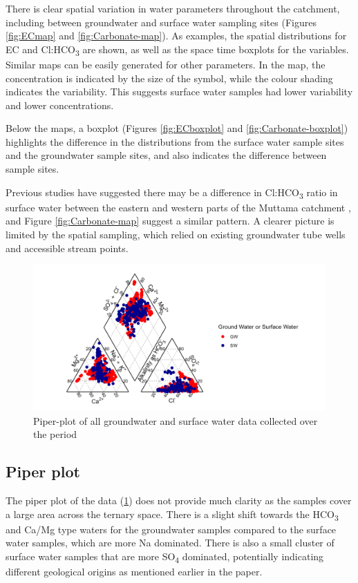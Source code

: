 \documentclass[, manuscript]{copernicus}
\begin{document}
There is clear spatial variation in water parameters throughout the
catchment, including between groundwater and surface water sampling
sites (Figures \ref{fig:ECmap} and \ref{fig:Carbonate-map}). As
examples, the spatial distributions for EC and Cl:HCO\textsubscript{3}
are shown, as well as the space time boxplots for the variables. Similar
maps can be easily generated for other parameters. In the map, the
concentration is indicated by the size of the symbol, while the colour
shading indicates the variability. This suggests surface water samples
had lower variability and lower concentrations.

Below the maps, a boxplot (Figures \ref{fig:ECboxplot} and
\ref{fig:Carbonate-boxplot}) highlights the difference in the
distributions from the surface water sample sites and the groundwater
sample sites, and also indicates the difference between sample sites.

Previous studies have suggested there may be a difference in
Cl:HCO\textsubscript{3} ratio in surface water between the eastern and
western parts of the Muttama catchment \citep{Conyers2008}, and Figure
\ref{fig:Carbonate-map} suggest a similar pattern. A clearer picture is
limited by the spatial sampling, which relied on existing groundwater
tube wells and accessible stream points.

\begin{figure}
\includegraphics[width=0.8\linewidth]{Figures/piper_plot} \caption{Piper-plot of all groundwater and surface water data collected over the period}\label{fig:piperplot}
\end{figure}

\subsection{Piper plot}

The piper plot of the data (\ref{fig:piperplot}) does not provide much
clarity as the samples cover a large area across the ternary space.
There is a slight shift towards the HCO\textsubscript{3} and Ca/Mg type
waters for the groundwater samples compared to the surface water
samples, which are more Na dominated. There is also a small cluster of
surface water samples that are more SO\textsubscript{4} dominated,
potentially indicating different geological origins as mentioned earlier
in the paper.
\end{document}
